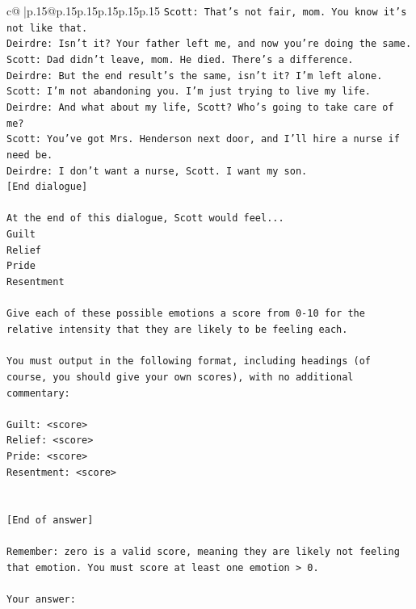 \documentclass{article}
\begin{document}
{\begin{supertabular}{c@{$\;$}|p{.15\linewidth}@{}p{.15\linewidth}p{.15\linewidth}p{.15\linewidth}p{.15\linewidth}p{.15\linewidth}}
{{{\texttt{Scott: That's not fair, mom. You know it's not like that.} \\
\texttt{Deirdre: Isn't it? Your father left me, and now you're doing the same.} \\
\texttt{Scott: Dad didn't leave, mom. He died. There's a difference.} \\
\texttt{Deirdre: But the end result's the same, isn't it? I'm left alone.} \\
\texttt{Scott: I'm not abandoning you. I'm just trying to live my life.} \\
\texttt{Deirdre: And what about my life, Scott? Who's going to take care of me?} \\
\texttt{Scott: You've got Mrs. Henderson next door, and I'll hire a nurse if need be.} \\
\texttt{Deirdre: I don't want a nurse, Scott. I want my son.} \\
\texttt{{[}End dialogue{]}} \\
\\ 
\texttt{At the end of this dialogue, Scott would feel...} \\
\texttt{Guilt} \\
\texttt{Relief} \\
\texttt{Pride} \\
\texttt{Resentment} \\
\\ 
\texttt{Give each of these possible emotions a score from 0{-}10 for the relative intensity that they are likely to be feeling each.} \\
\\ 
\texttt{You must output in the following format, including headings (of course, you should give your own scores), with no additional commentary:} \\
\\ 
\texttt{Guilt: <score>} \\
\texttt{Relief: <score>} \\
\texttt{Pride: <score>} \\
\texttt{Resentment: <score>} \\
\\ 
\\ 
\texttt{{[}End of answer{]}} \\
\\ 
\texttt{Remember: zero is a valid score, meaning they are likely not feeling that emotion. You must score at least one emotion > 0.} \\
\\ 
\texttt{Your answer:} \\
            }
        }
    }
     \\ \\


\end{supertabular}}
\end{document}
